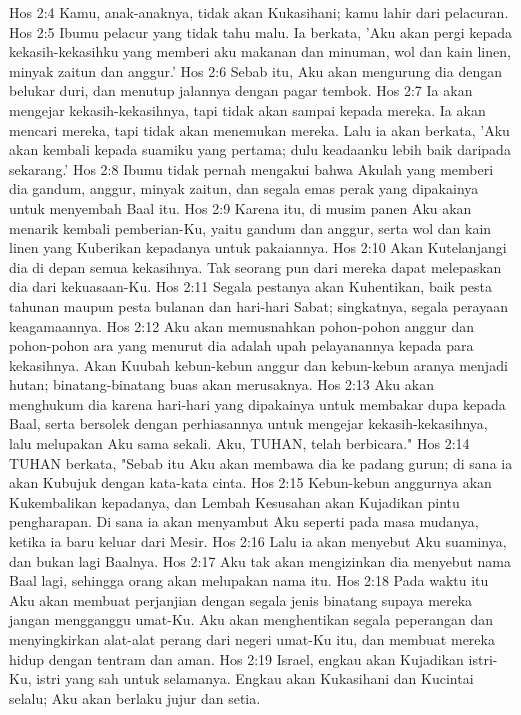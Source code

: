 Hos 2:4  Kamu, anak-anaknya, tidak akan Kukasihani; kamu lahir dari pelacuran.
Hos 2:5  Ibumu pelacur yang tidak tahu malu. Ia berkata, 'Aku akan pergi kepada kekasih-kekasihku yang memberi aku makanan dan minuman, wol dan kain linen, minyak zaitun dan anggur.'
Hos 2:6  Sebab itu, Aku akan mengurung dia dengan belukar duri, dan menutup jalannya dengan pagar tembok.
Hos 2:7  Ia akan mengejar kekasih-kekasihnya, tapi tidak akan sampai kepada mereka. Ia akan mencari mereka, tapi tidak akan menemukan mereka. Lalu ia akan berkata, 'Aku akan kembali kepada suamiku yang pertama; dulu keadaanku lebih baik daripada sekarang.'
Hos 2:8  Ibumu tidak pernah mengakui bahwa Akulah yang memberi dia gandum, anggur, minyak zaitun, dan segala emas perak yang dipakainya untuk menyembah Baal itu.
Hos 2:9  Karena itu, di musim panen Aku akan menarik kembali pemberian-Ku, yaitu gandum dan anggur, serta wol dan kain linen yang Kuberikan kepadanya untuk pakaiannya.
Hos 2:10  Akan Kutelanjangi dia di depan semua kekasihnya. Tak seorang pun dari mereka dapat melepaskan dia dari kekuasaan-Ku.
Hos 2:11  Segala pestanya akan Kuhentikan, baik pesta tahunan maupun pesta bulanan dan hari-hari Sabat; singkatnya, segala perayaan keagamaannya.
Hos 2:12  Aku akan memusnahkan pohon-pohon anggur dan pohon-pohon ara yang menurut dia adalah upah pelayanannya kepada para kekasihnya. Akan Kuubah kebun-kebun anggur dan kebun-kebun aranya menjadi hutan; binatang-binatang buas akan merusaknya.
Hos 2:13  Aku akan menghukum dia karena hari-hari yang dipakainya untuk membakar dupa kepada Baal, serta bersolek dengan perhiasannya untuk mengejar kekasih-kekasihnya, lalu melupakan Aku sama sekali. Aku, TUHAN, telah berbicara."
Hos 2:14  TUHAN berkata, "Sebab itu Aku akan membawa dia ke padang gurun; di sana ia akan Kubujuk dengan kata-kata cinta.
Hos 2:15  Kebun-kebun anggurnya akan Kukembalikan kepadanya, dan Lembah Kesusahan akan Kujadikan pintu pengharapan. Di sana ia akan menyambut Aku seperti pada masa mudanya, ketika ia baru keluar dari Mesir.
Hos 2:16  Lalu ia akan menyebut Aku suaminya, dan bukan lagi Baalnya.
Hos 2:17  Aku tak akan mengizinkan dia menyebut nama Baal lagi, sehingga orang akan melupakan nama itu.
Hos 2:18  Pada waktu itu Aku akan membuat perjanjian dengan segala jenis binatang supaya mereka jangan mengganggu umat-Ku. Aku akan menghentikan segala peperangan dan menyingkirkan alat-alat perang dari negeri umat-Ku itu, dan membuat mereka hidup dengan tentram dan aman.
Hos 2:19  Israel, engkau akan Kujadikan istri-Ku, istri yang sah untuk selamanya. Engkau akan Kukasihani dan Kucintai selalu; Aku akan berlaku jujur dan setia.
